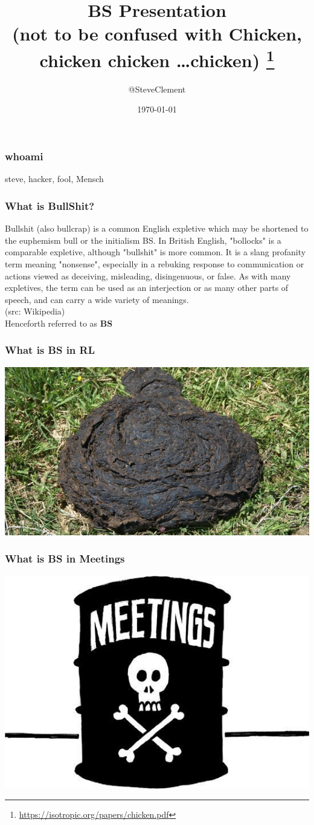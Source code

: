 \documentclass[a4paper]{beamer}
\title{BS Presentation\\(not to be confused with Chicken, chicken chicken \ldots  chicken) \footnote{\url{https://isotropic.org/papers/chicken.pdf}}}
\author{@SteveClement}
\date{\today}
\begin{document}

\frame{\titlepage} 


\begin{frame}
\frametitle{whoami} 
steve, hacker, fool, Mensch
\end{frame}

\begin{frame}
\frametitle{What is BullShit?} 
Bullshit (also bullcrap) is a common English expletive which may be shortened to the euphemism bull or the initialism BS. In British English, "bollocks" is a comparable expletive, although "bullshit" is more common. It is a slang profanity term meaning "nonsense", especially in a rebuking response to communication or actions viewed as deceiving, misleading, disingenuous, or false. As with many expletives, the term can be used as an interjection or as many other parts of speech, and can carry a wide variety of meanings. \\ (src: Wikipedia)
\\
Henceforth referred to as {\bf BS}

\end{frame}

\begin{frame}
\frametitle{What is BS in RL}
\includegraphics[scale=0.60]{img/cowpat.jpg}
\end{frame}

\begin{frame}
\frametitle{What is BS in Meetings} 
\includegraphics[scale=0.60]{img/Image-00047.jpeg}
\end{frame}
\end{document}
